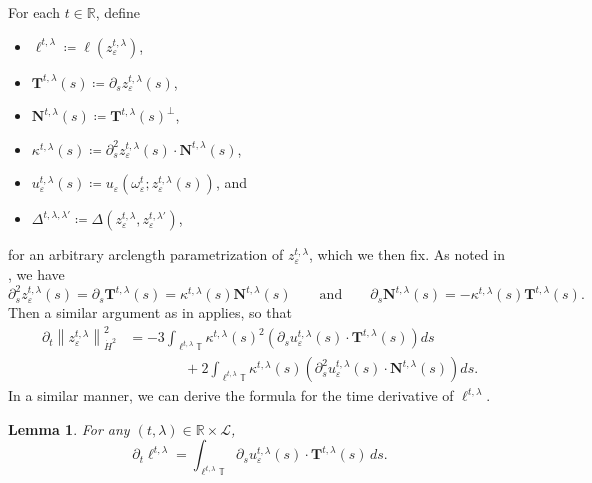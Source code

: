 \documentclass[reqno,centertags,12pt]{amsart}
\newtheorem{lemma}[theorem]{Lemma}
\theoremstyle{definition}
\numberwithin{equation}{section}
\newcommand{\norm}[1]{\left\|#1\right\|}
\newcommand{\bbR}{{\mathbb{R}}}
\newcommand{\bbT}{{\mathbb{T}}}
\newcommand{\eps}{\varepsilon}
\begin{document}
For each $t\in\bbR$, define
\begin{itemize}
    \item $\ell^{t,\lambda}\coloneqq \ell(z_{\eps}^{t,\lambda})$,

    \item $\mathbf{T}^{t,\lambda}(s) \coloneqq \partial_{s}z_{\eps}^{t,\lambda}(s)$,

    \item $\mathbf{N}^{t,\lambda}(s) \coloneqq \mathbf{T}^{t,\lambda}(s)^{\perp}$,

    \item $\kappa^{t,\lambda}(s) \coloneqq
    \partial_{s}^{2}z_{\eps}^{t,\lambda}(s)\cdot \mathbf{N}^{t,\lambda}(s)$,

    \item $u_{\eps}^{t,\lambda}(s) \coloneqq
    u_{\eps}(\omega_{\eps}^{t}; z_{\eps}^{t,\lambda}(s))$, and

    \item $\Delta^{t,\lambda,\lambda'} \coloneqq
    \Delta(z_{\eps}^{t,\lambda}, z_{\eps}^{t,\lambda'})$,
\end{itemize}
for an arbitrary arclength parametrization of $z_{\eps}^{t,\lambda}$, which we then fix.
As noted in \cite[Section~4]{JeoZlaTouching}, we have
\[
    \partial_{s}^{2}z_{\eps}^{t,\lambda}(s) = \partial_{s}\mathbf{T}^{t,\lambda}(s)
    = \kappa^{t,\lambda}(s)\mathbf{N}^{t,\lambda}(s)
    \qquad\textrm{and}\qquad
    \partial_{s}\mathbf{N}^{t,\lambda}(s) = -\kappa^{t,\lambda}(s)\mathbf{T}^{t,\lambda}(s).
\]
Then a similar argument as in \cite[Lemma~4.1]{JeoZlaTouching} applies, so that
\begin{equation}\label{3.2}
    \begin{aligned}
        \partial_{t}\norm{z_{\eps}^{t,\lambda}}_{\dot{H}^{2}}^{2}
        &= -3\int_{\ell^{t,\lambda}\bbT}\kappa^{t,\lambda}(s)^{2}
        \left(\partial_{s}u_{\eps}^{t,\lambda}(s) \cdot \mathbf{T}^{t,\lambda}(s)\right)ds
        \\&\qquad\qquad        
        + 2\int_{\ell^{t,\lambda}\bbT}\kappa^{t,\lambda}(s)
        \left(\partial_{s}^{2}u_{\eps}^{t,\lambda}(s) \cdot \mathbf{N}^{t,\lambda}(s)\right)ds.
    \end{aligned}
\end{equation}
In a similar manner, we can derive the formula for the time derivative of $\ell^{t,\lambda}$.

\begin{lemma}\label{L3.1}
    For any $(t,\lambda)\in\bbR\times\mathcal{L}$,
    \[
        \partial_{t}\ell^{t,\lambda}
        = \int_{\ell^{t,\lambda}\bbT}
        \partial_{s}u_{\eps}^{t,\lambda}(s)\cdot\mathbf{T}^{t,\lambda}(s)\,ds.
    \]
\end{lemma}
\end{document}
